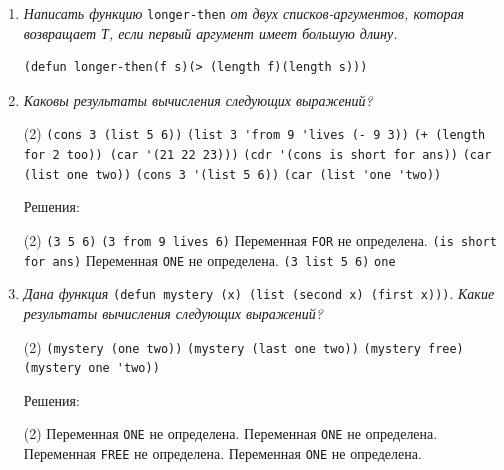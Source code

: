 \documentclass[12pt]{report}
\begin{document}
\begin{enumerate}[wide=0pt]
\begin{tasks}[label=\arabic*), item-indent=3pt, after-item-skip=1pt]
	\task Переменные \lstinline|b, c| не определены. Возможное устранение ошибки: \lstinline|(list 'a '(b c))|
	\task \lstinline|(A (B C))|
	\task Поскольку введен запрет на вычисление (quote), конструкция \lstinline|length '(1 2 3)))| будет интерпретирована как данные, а не как функция. Возможное устранение ошибки: \lstinline|(list (+ 1 (length '(1 2 3))))|
\end{tasks}
\item \textit{Написать функцию} \lstinline|longer-then| \textit{от двух списков-аргументов, которая возвращает Т, если первый аргумент имеет большую длину.}
\begin{lstlisting}
(defun longer-then(f s)(> (length f)(length s)))
\end{lstlisting}
\item \textit{Каковы результаты вычисления следующих выражений?}
\begin{tasks}[label=\arabic*), item-indent=3pt, after-item-skip=1pt](2)
	\task \lstinline|(cons 3 (list 5 6))| 
	\task \lstinline|(list 3 'from 9 'lives (- 9 3))|
	\task \lstinline|(+ (length for 2 too)) (car '(21 22 23)))|
	\task \lstinline|(cdr '(cons is short for ans))|
	\task \lstinline|(car (list one two))| 
	\task \lstinline|(cons 3 '(list 5 6))|
	\task \lstinline|(car (list 'one 'two))|
\end{tasks}
Решения:
\begin{tasks}[label=\arabic*), item-indent=3pt, after-item-skip=1pt](2)
	\task \lstinline|(3 5 6)| 
	\task \lstinline|(3 from 9 lives 6)|
	\task  Переменная \lstinline|FOR| не определена.
	\task \lstinline|(is short for ans)|
	\task Переменная \lstinline|ONE| не определена.
	\task \lstinline|(3 list 5 6)|
	\task \lstinline|one|
\end{tasks}
\item \textit{Дана функция} \lstinline|(defun mystery (x) (list (second x) (first x)))|. \textit{Какие результаты вычисления следующих выражений?}
\begin{tasks}[label=\arabic*), item-indent=3pt, after-item-skip=1pt](2)
	\task \lstinline|(mystery (one two))| 
	\task \lstinline|(mystery (last one two))|
	\task \lstinline|(mystery free)|
	\task \lstinline|(mystery one 'two))|
\end{tasks}
Решения:
\begin{tasks}[label=\arabic*), item-indent=3pt, after-item-skip=1pt](2)
	\task Переменная \lstinline|ONE| не определена.
	\task Переменная \lstinline|ONE| не определена.
	\task Переменная \lstinline|FREE| не определена.
	\task Переменная \lstinline|ONE| не определена. 

\end{tasks}
\end{enumerate}
\end{document}
